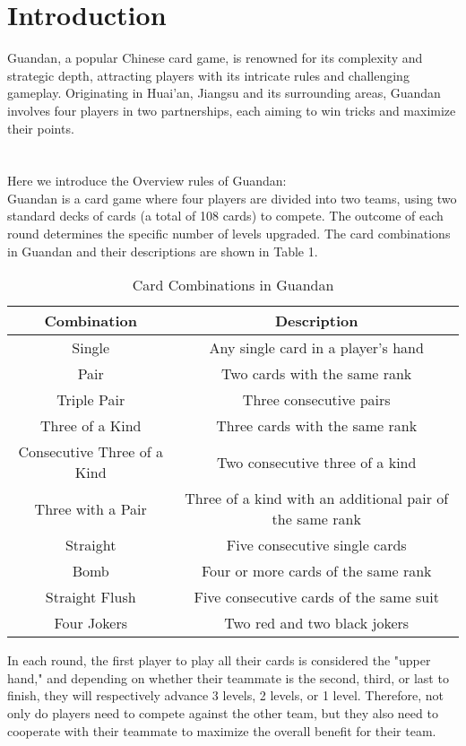 \documentclass{article}
\begin{document}
\section{Introduction}
Guandan, a popular Chinese card game, is renowned for its complexity and strategic depth, attracting players with its intricate rules and challenging gameplay. 
Originating in Huai'an, Jiangsu and its surrounding areas, Guandan involves four players in two partnerships, each aiming to win tricks and maximize their points. \\
\\ \hspace*{\fill} \\
Here we introduce the Overview rules of Guandan:\\
Guandan is a card game where four players are divided into two teams, using two standard decks of cards (a total of 108 cards) to compete. 
The outcome of each round determines the specific number of levels upgraded. The card combinations in Guandan and their descriptions are shown in Table 1.
\begin{table}[H]
    \centering
    \begin{tabular}{|c|c|}
    \hline
    Combination & Description \\ \hline
    Single & Any single card in a player's hand \\ \hline
    Pair & Two cards with the same rank \\ \hline
    Triple Pair	& Three consecutive pairs \\ \hline
    Three of a Kind	& Three cards with the same rank \\ \hline
    Consecutive Three of a Kind	& Two consecutive three of a kind \\ \hline
    Three with a Pair & Three of a kind with an additional pair of the same rank \\ \hline
    Straight & Five consecutive single cards \\ \hline
    Bomb & Four or more cards of the same rank \\ \hline
    Straight Flush & Five consecutive cards of the same suit \\ \hline
    Four Jokers	& Two red and two black jokers \\ \hline
    \end{tabular}
    \caption{Card Combinations in Guandan}
\end{table}
In each round, the first player to play all their cards is considered the "upper hand," and depending on whether their teammate is the second, third, or last to finish, they will respectively advance 3 levels, 2 levels, or 1 level. Therefore, not only do players need to compete against the other team, but they also need to cooperate with their teammate to maximize the overall benefit for their team.\\
\end{document}
